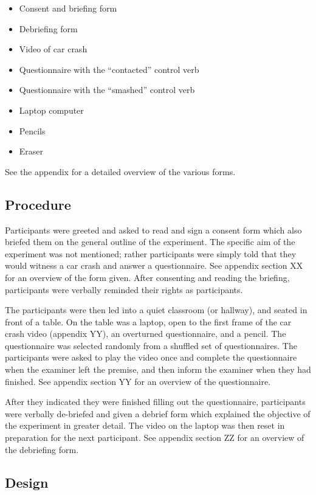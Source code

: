 \documentclass[a4paper,11pt]{report}
\begin{document}
\begin{itemize}
\item Consent and briefing form
\item Debriefing form
\item Video of car crash
\item Questionnaire with the “contacted” control verb
\item Questionnaire with the “smashed” control verb
\item Laptop computer
\item Pencils
\item Eraser
\end{itemize}

See the appendix for a detailed overview of the various forms.

\subsection{Procedure}

Participants were greeted and asked to read and sign a consent form which also
briefed them on the general outline of the experiment. The specific aim of the
experiment was not mentioned; rather participants were simply told that they
would witness a car crash and answer a questionnaire. See appendix section XX
for an overview of the form given. After consenting and reading the briefing,
participants were verbally reminded their rights as participants.

The participants were then led into a quiet classroom (or hallway), and seated
in front of a table. On the table was a laptop, open to the first frame of the
car crash video (appendix YY), an overturned questionnaire, and a pencil. The
questionnaire was selected randomly from a shuffled set of questionnaires. The
participants were asked to play the video once and complete the questionnaire
when the examiner left the premise, and then inform the examiner when they had
finished. See appendix section YY for an overview of the questionnaire.

After they indicated they were finished filling out the questionnaire,
participants were verbally de-briefed and given a debrief form which explained
the objective of the experiment in greater detail. The video on the laptop was
then reset in preparation for the next participant. See appendix section ZZ for
an overview of the debriefing form.

\subsection{Design}
\end{document}
